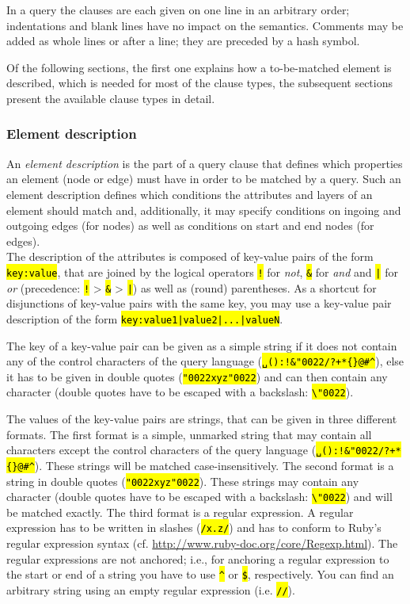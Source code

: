 \documentclass[12pt]{scrartcl}
\newcommand{\quo}{\char"0022}
\newcommand{\code}[1]{\hl{\texttt{#1}}}
\begin{document}
In a query the clauses are each given on one line in an arbitrary order; indentations and blank lines have no impact on the semantics.
Comments may be added as whole lines or after a line; they are preceded by a hash symbol.

Of the following sections, the first one explains how a to-be-matched element is described, which is needed for most of the clause types, the subsequent sections present the available clause types in detail.

\subsubsection{Element description}\label{elementbeschreibung}

An \textit{element description} is the part of a query clause that defines which properties an element (node or edge) must have in order to be matched by a query.
Such an element description defines which conditions the attributes and layers of an element should match and, additionally, it may specify conditions on ingoing and outgoing edges (for nodes) as well as conditions on start and end nodes (for edges).\\

The description of the attributes is composed of key-value pairs of the form \code{key:value}, that are joined by the logical operators \code{!} for \textit{not}, \code{\&} for \textit{and} and \code{|} for \textit{or} (precedence: \code{!} > \code{\&} > \code{|}) as well as (round) parentheses.
As a shortcut for disjunctions of key-value pairs with the same key, you may use a key-value pair description of the form \code{key:value1|value2|...|valueN}.

The key of a key-value pair can be given as a simple string if it does not contain any of the control characters of the query language (\code{␣():!\&\quo/?+*\{\}@\#\textasciicircum}), else it has to be given in double quotes (\code{{\quo}xyz\quo}) and can then contain any character (double quotes have to be escaped with a backslash: \code{\textbackslash\quo}).

\label{zeichenketten}The values of the key-value pairs are strings, that can be given in three different formats.
The first format is a simple, unmarked string that may contain all characters except the control characters of the query language (\code{␣():!\&\quo/?+*\{\}@\#\textasciicircum}).
These strings will be matched case-insensitively.
The second format is a string in double quotes (\code{{\quo}xyz\quo}).
These strings may contain any character (double quotes have to be escaped with a backslash: \code{\textbackslash\quo}) and will be matched exactly.
The third format is a regular expression.
A regular expression has to be written in slashes (\code{/x.z/}) and has to conform to Ruby’s regular expression syntax (cf. \url{http://www.ruby-doc.org/core/Regexp.html}).
The regular expressions are not anchored; i.e., for anchoring a regular expression to the start or end of a string you have to use \code{\textasciicircum} or \code{\$}, respectively.
You can find an arbitrary string using an empty regular expression (i.e. \code{//}).
\end{document}
